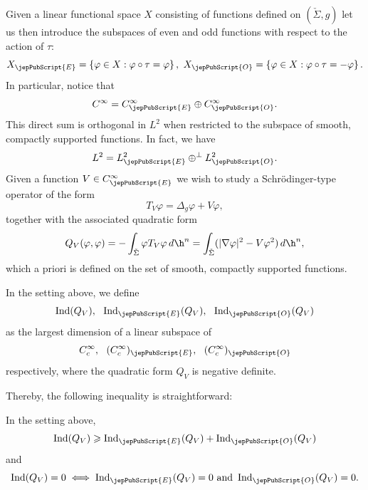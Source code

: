         Given a linear functional space $X$ consisting of functions defined on $(\check{\Sigma},g)$ let us then introduce the subspaces of even and odd functions with respect to the action of $\tau$:
        	\[
        	X_{\jepPubScript{E}}=\left\{\varphi\in X: \varphi\circ\tau=\varphi \right\}, \ X_{\jepPubScript{O}}=\left\{\varphi\in X: \varphi\circ\tau=-\varphi \right\}.
        	\]	
        	In particular, notice that 
        	\[
        	C^{\infty}=C^{\infty}_{{\jepPubScript{E}}}\oplus C^{\infty}_{{\jepPubScript{O}}}.
        	\]
        	This direct sum is orthogonal in $L^2$ when restricted to the subspace of smooth, compactly supported functions. In fact, we have
        	\[
        	L^2=L^2_{{\jepPubScript{E}}}\oplus^{\perp} L^2_{{\jepPubScript{O}}}.
        	\]
        Given a function $V\in C^{\infty}_{{\jepPubScript{E}}}$ we wish to study a Schr\"odinger-type operator of the form
        	\[
        	T_V\varphi=\Delta_g\varphi+V\varphi, 
        	\]
        	together with the associated quadratic form
        	\[
        	Q_V(\varphi,\varphi)=-\int_{\check{\Sigma}}\varphi T_V \varphi\,d\h^n=\int_{\check{\Sigma}}(|\nabla \varphi|^2-V\varphi^2)\,d\h^n,
        	\]
        	which a priori is defined on the set of smooth, compactly supported functions.
        	
        	
        	\begin{definition}\label{def:index} In the setting above, we define
        		\[
        		\operatorname{Ind} (Q_V), \ \ \operatorname{Ind}_{{\jepPubScript{E}}} (Q_V), \ \ \operatorname{Ind}_{{\jepPubScript{O}}} (Q_V)
        		\]
        		as the largest dimension of a linear subspace of 
        		\[
        		C^{\infty}_c, \ \ (C^{\infty}_c)_{{\jepPubScript{E}}}, \ \ (C^{\infty}_c)_{{\jepPubScript{O}}}
        		\]
        		respectively, where the quadratic form $Q_V$ is negative definite.
        	\end{definition}	
        	
        	
        	Thereby, the following inequality is straightforward:
        	
        	\begin{lem}\label{lem:ineq}
        		In the setting above, 
        		\[
        		\operatorname{Ind} (Q_V) \geqslant \operatorname{Ind}_{{\jepPubScript{E}}} (Q_V)+\operatorname{Ind}_{{\jepPubScript{O}}} (Q_V)
        		\]
        		and
        		\[
        		\operatorname{Ind} (Q_V)=0 \iff \operatorname{Ind}_{{\jepPubScript{E}}} (Q_V)=0 \ \text{and} \ \operatorname{Ind}_{{\jepPubScript{O}}} (Q_V)=0.
        		\] 
        	\end{lem}
        	
